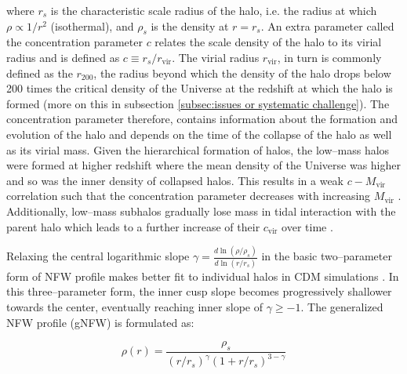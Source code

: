 \documentclass[paper=a4, fontsize=11pt]{scrartcl} %
\numberwithin{equation}{section} %
\numberwithin{figure}{section} %
\numberwithin{table}{section} %
\begin{document}
where $r_s$ is the characteristic scale radius of the halo, i.e. the radius at which $\rho \propto 1/r^2$ (isothermal), and $\rho_s$ is the density at $r=r_s$. An extra parameter called the concentration parameter $c$ relates the scale density of the halo to its virial radius and is defined as $c\equiv r_s/r_\mathrm{vir}$. The virial radius $r_\mathrm{vir}$, in turn is commonly defined as the $r_{200}$, the radius beyond which the density of the halo drops below 200 times the critical density of the Universe at the redshift at which the halo is formed (more on this in subsection \ref{subsec:issues or systematic challenge}). The concentration parameter therefore, contains information about the formation and evolution of the halo and depends on the time of the collapse of the halo as well as its virial mass. Given the hierarchical formation of halos, the low--mass halos were formed at higher redshift where the mean density of the Universe was higher and so was the inner density of collapsed halos. This results in a weak $c-M_\mathrm{vir}$ correlation such that the concentration parameter decreases with increasing $M_\mathrm{vir}$ \citep[][]{}. %
  Additionally, low--mass subhalos gradually lose mass in tidal interaction with the parent halo which leads to a further increase of their $c_\mathrm{vir}$ over time \citep{Bullock+2001, Maccio2008}.

Relaxing the central logarithmic slope $\gamma = \frac{d\ln(\rho/\rho_s)}{d\ln(r/r_s)}$ in the basic two--parameter form of NFW profile makes better fit to individual halos in CDM simulations \citep[][]{}. %
 In this three--parameter form, the inner cusp slope becomes progressively shallower towards the center, eventually reaching inner slope of $\gamma\geq-1$. The generalized NFW profile (gNFW) is formulated as:

\begin{equation}
\rho(r) = \frac{\rho_s}{(r / r_s)^\gamma(1 + r/r_s)^{3-\gamma}} \nonumber
\end{equation}  %
\end{document}
